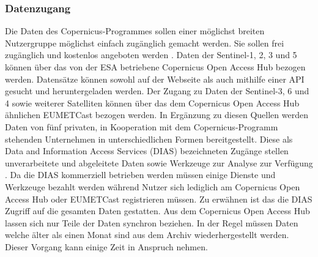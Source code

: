 \subsubsection{Datenzugang}
Die Daten des Copernicus-Programmes sollen einer möglichst breiten Nutzergruppe möglichst einfach zugänglich gemacht werden. Sie sollen frei zugänglich und kostenlos angeboten 
werden \cite{copernicus_regulation}. Daten der Sentinel-1, 2, 3 und 5 können über das von der ESA betriebene Copernicus Open Access Hub bezogen werden. Datensätze können sowohl
auf der Webseite als auch mithilfe einer API gesucht und heruntergeladen werden. Der Zugang zu Daten der Sentinel-3, 6 und 4 sowie weiterer Satelliten können über das 
dem Copernicus Open Access Hub ähnlichen EUMETCast bezogen werden.
In Ergänzung zu diesen Quellen werden Daten von fünf privaten, in Kooperation mit dem Copernicus-Programm stehenden Unternehmen in unterschiedlichen Formen bereitgestellt. 
Diese als Data and Information Access Services (DIAS) bezeichneten Zugänge stellen unverarbeitete und abgeleitete Daten sowie Werkzeuge zur Analyse zur Verfügung \cite{dias_factsheet}.
Da die DIAS kommerziell betrieben werden müssen einige Dienste und Werkzeuge bezahlt werden während Nutzer sich lediglich am Copernicus Open Access Hub oder EUMETCast 
registrieren müssen. Zu erwähnen ist das die DIAS Zugriff auf die gesamten Daten gestatten. Aus dem Copernicus Open Access Hub lassen sich nur Teile der Daten synchron beziehen.
In der Regel müssen Daten welche älter als einen Monat sind aus dem Archiv wiederhergestellt werden. Dieser Vorgang kann einige Zeit in Anspruch nehmen. 


